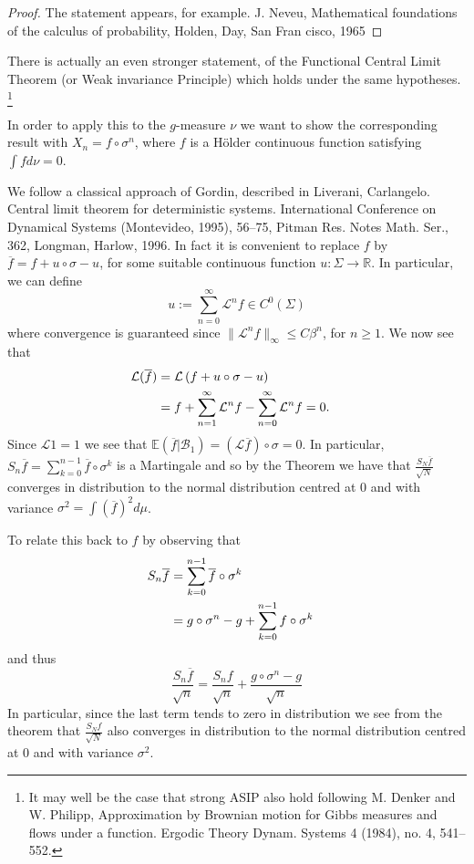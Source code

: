 \documentclass[11pt]{scrartcl}
\theoremstyle{plain} %
\theoremstyle{definition}
\begin{document}
\begin{proof}
The statement appears, for example. J. Neveu, Mathematical foundations of the calculus of probability, Holden, Day, San Fran cisco, 1965
\end{proof}

There is actually an even stronger statement, of the Functional Central Limit Theorem
(or Weak invariance Principle) which holds under the same hypotheses.
\footnote{It may well be the case that strong ASIP also hold following
M.  Denker and W. Philipp, 
Approximation by Brownian motion for Gibbs measures and flows under a function.
Ergodic Theory Dynam. Systems 4 (1984), no. 4, 541--552.}


In order to apply this to the $g$-measure $\nu$ we want to show the corresponding result with $X_n = f \circ \sigma^n$, where $f$ is a H\"older continuous function satisfying $\int f d\nu =0$.    

We follow a classical approach of Gordin, described in 
Liverani, Carlangelo.
Central limit theorem for deterministic systems. International Conference on Dynamical Systems (Montevideo, 1995), 56--75,
Pitman Res. Notes Math. Ser., 362, Longman, Harlow, 1996.
In fact it is convenient to replace $f$ by $\overline f = f + u\circ \sigma - u$, for some suitable continuous function $u: \Sigma \to \mathbb R$.    In particular, 
we can define 
$$u := \sum_{n=0}^\infty \mathcal L^n f \in C^0(\Sigma)$$ where convergence
is guaranteed since $\|\mathcal L^n f\|_\infty   \leq C \beta^n$, for $n \geq 1$.  
We now see that 
$$
\begin{aligned}
\mathcal L (\overline f) &= 
\mathcal L \left(
 f + u\circ \sigma - u
\right)\cr
&= f +  \sum_{n=1}^\infty \mathcal L^n f 
-  \sum_{n=0}^\infty \mathcal L^n f = 0.
\cr
\end{aligned}
$$
Since $\mathcal L 1 = 1$ we see that 
$\mathbb E (\overline f  | \mathcal  B_1) = (\mathcal L \overline f) \circ \sigma = 0$.
In particular,  $S_n\overline f = \sum_{k=0}^{n-1} \overline f \circ \sigma^k$ is a Martingale  and so by the Theorem we have that 
$\frac{S_N\overline f}{\sqrt{N}}$ converges in distribution to the normal distribution centred at $0$ and with variance $\sigma^2 = \int  (\overline f)^2 d\mu$.

To relate this back to $f$ by observing that
$$
\begin{aligned}
S_n\overline f &= \sum_{k=0}^{n-1} \overline f \circ \sigma^k \cr 
&  =   g\circ \sigma^n   - g  +  \sum_{k=0}^{n-1} f \circ \sigma^k 
\end{aligned}
$$
and thus 
$$
\frac{S_n\overline f}{\sqrt{n}}
= \frac{S_n f}{\sqrt{n}} + \frac{g\circ \sigma^n   - g}{\sqrt{n}}
$$
In particular, since the last term tends to zero in distribution we see from the theorem that 
$\frac{S_N  f}{\sqrt{N}}$ also converges in distribution to the normal distribution centred at $0$ and with variance $\sigma^2$.  
\end{document}
